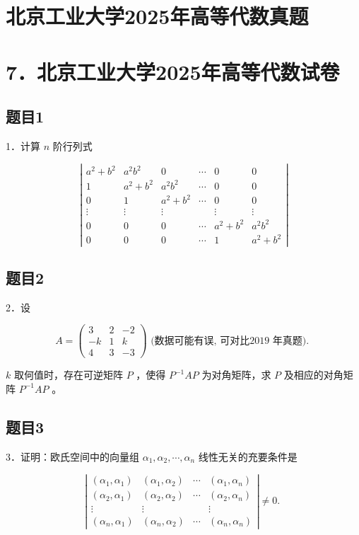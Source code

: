 \documentclass{article}
\begin{document}
\section*{北京工业大学2025年高等代数真题}
\section*{7．北京工业大学2025年高等代数试卷}

\subsection{题目1}
1．计算 \(n\) 阶行列式

\[
\left|\begin{array}{cccccc}
a^{2}+b^{2} & a^{2} b^{2} & 0 & \cdots & 0 & 0 \\
1 & a^{2}+b^{2} & a^{2} b^{2} & \cdots & 0 & 0 \\
0 & 1 & a^{2}+b^{2} & \cdots & 0 & 0 \\
\vdots & \vdots & \vdots & & \vdots & \vdots \\
0 & 0 & 0 & \cdots & a^{2}+b^{2} & a^{2} b^{2} \\
0 & 0 & 0 & \cdots & 1 & a^{2}+b^{2}
\end{array}\right|
\]

\subsection{题目2}
2．设

\[
A=\left(\begin{array}{ccc}
3 & 2 & -2 \\
-k & 1 & k \\
4 & 3 & -3
\end{array}\right) \text { (数据可能有误, 可对比2019 年真题). }
\]

\(k\) 取何值时，存在可逆矩阵 \(P\) ，使得 \(P^{-1} A P\) 为对角矩阵，求 \(P\) 及相应的对角矩阵 \(P^{-1} A P\) 。

\subsection{题目3}
3．证明：欧氏空间中的向量组 \(\alpha_{1}, \alpha_{2}, \cdots, \alpha_{n}\) 线性无关的充要条件是

\[
\left|\begin{array}{cccc}
\left(\alpha_{1}, \alpha_{1}\right) & \left(\alpha_{1}, \alpha_{2}\right) & \cdots & \left(\alpha_{1}, \alpha_{n}\right) \\
\left(\alpha_{2}, \alpha_{1}\right) & \left(\alpha_{2}, \alpha_{2}\right) & \cdots & \left(\alpha_{2}, \alpha_{n}\right) \\
\vdots & \vdots & & \vdots \\
\left(\alpha_{n}, \alpha_{1}\right) & \left(\alpha_{n}, \alpha_{2}\right) & \cdots & \left(\alpha_{n}, \alpha_{n}\right)
\end{array}\right| \neq 0 \text {. }
\]
\end{document}
